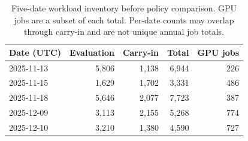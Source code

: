 \begin{table}[htbp]
\centering
\small
\caption[Five-date cohort inventory]{Five-date workload inventory before policy comparison. GPU jobs are a subset of each total. Per-date counts may overlap through carry-in and are not unique annual job totals.}
\label{tab:table05-campaign-inputs}
\begin{tabular}{lrrrr}
\toprule
Date (UTC) & Evaluation & Carry-in & Total & GPU jobs \\
\midrule
2025-11-13 & 5,806 & 1,138 & 6,944 & 226 \\
2025-11-15 & 1,629 & 1,702 & 3,331 & 486 \\
2025-11-18 & 5,646 & 2,077 & 7,723 & 387 \\
2025-12-09 & 3,113 & 2,155 & 5,268 & 774 \\
2025-12-10 & 3,210 & 1,380 & 4,590 & 727 \\
\bottomrule
\end{tabular}
\end{table}
